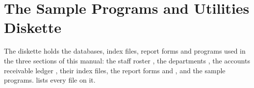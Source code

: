 \section{The Sample Programs and Utilities Diskette}
The diskette holds the databases, index files, report forms and programs used
in the three sections of this manual: the staff roster , the
departments , the accounts receivable ledger
, their index files, the report forms  and
, and the sample programs.   lists
every file on it.
